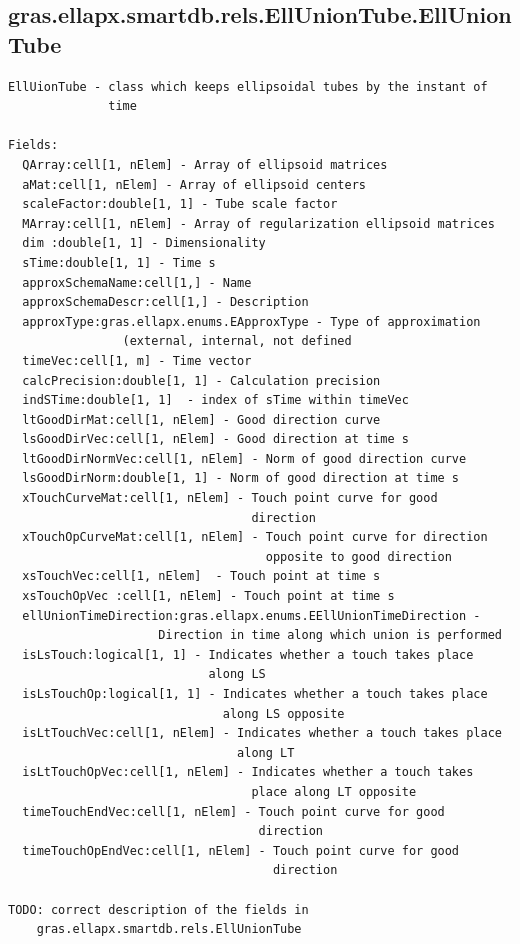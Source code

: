 \documentclass[letterpaper,10pt,english]{sphinxmanual}
\begin{document}
\subsection{gras.ellapx.smartdb.rels.EllUnionTube.EllUnionTube}
\label{chap_functions:gras-ellapx-smartdb-rels-elluniontube-elluniontube}
\begin{Verbatim}[commandchars=\\\{\}]
EllUionTube - class which keeps ellipsoidal tubes by the instant of
              time

Fields:
  QArray:cell[1, nElem] - Array of ellipsoid matrices
  aMat:cell[1, nElem] - Array of ellipsoid centers
  scaleFactor:double[1, 1] - Tube scale factor
  MArray:cell[1, nElem] - Array of regularization ellipsoid matrices
  dim :double[1, 1] - Dimensionality
  sTime:double[1, 1] - Time s
  approxSchemaName:cell[1,] - Name
  approxSchemaDescr:cell[1,] - Description
  approxType:gras.ellapx.enums.EApproxType - Type of approximation
                (external, internal, not defined
  timeVec:cell[1, m] - Time vector
  calcPrecision:double[1, 1] - Calculation precision
  indSTime:double[1, 1]  - index of sTime within timeVec
  ltGoodDirMat:cell[1, nElem] - Good direction curve
  lsGoodDirVec:cell[1, nElem] - Good direction at time s
  ltGoodDirNormVec:cell[1, nElem] - Norm of good direction curve
  lsGoodDirNorm:double[1, 1] - Norm of good direction at time s
  xTouchCurveMat:cell[1, nElem] - Touch point curve for good
                                  direction
  xTouchOpCurveMat:cell[1, nElem] - Touch point curve for direction
                                    opposite to good direction
  xsTouchVec:cell[1, nElem]  - Touch point at time s
  xsTouchOpVec :cell[1, nElem] - Touch point at time s
  ellUnionTimeDirection:gras.ellapx.enums.EEllUnionTimeDirection -
                     Direction in time along which union is performed
  isLsTouch:logical[1, 1] - Indicates whether a touch takes place
                            along LS
  isLsTouchOp:logical[1, 1] - Indicates whether a touch takes place
                              along LS opposite
  isLtTouchVec:cell[1, nElem] - Indicates whether a touch takes place
                                along LT
  isLtTouchOpVec:cell[1, nElem] - Indicates whether a touch takes
                                  place along LT opposite
  timeTouchEndVec:cell[1, nElem] - Touch point curve for good
                                   direction
  timeTouchOpEndVec:cell[1, nElem] - Touch point curve for good
                                     direction

TODO: correct description of the fields in
    gras.ellapx.smartdb.rels.EllUnionTube
\end{Verbatim}
\end{document}
